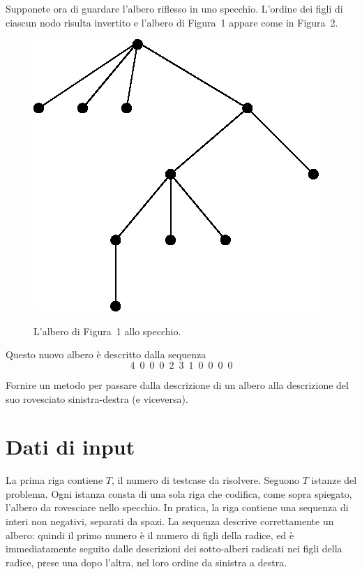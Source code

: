\documentclass[a4paper,11pt]{article}
\begin{document}
Supponete ora di guardare l'albero riflesso in uno specchio. L'ordine dei figli di ciascun nodo risulta invertito e l'albero di Figura~1 appare come in Figura~2.

\begin{figure}[h!]
  \centering
    \includegraphics[scale=0.3]{figs/fig2.png}\\
    \caption{L'albero di Figura~1 allo specchio.}
\end{figure}

Questo nuovo albero \`e descritto dalla sequenza
\[
4\,\,\,0\,\,\,0\,\,\,0\,\,\,2\,\,\,3\,\,\,1\,\,\,0\,\,\,0\,\,\,0\,\,\,0
\]

Fornire un metodo per passare dalla descrizione di un albero alla descrizione del suo rovesciato sinistra-destra (e viceversa).


\section*{Dati di input}

La prima riga contiene $T$, il numero di testcase da risolvere. Seguono $T$
istanze del problema. Ogni istanza consta di una sola riga che codifica, come sopra spiegato, l'albero da rovesciare nello specchio.
In pratica, la riga contiene una sequenza di interi non negativi, separati da spazi. La sequenza descrive correttamente un albero: quindi il primo numero è il numero di figli della radice, ed è immediatamente seguito dalle descrizioni dei sotto-alberi radicati nei figli della radice, prese una dopo l'altra, nel loro ordine da sinistra a destra.
\end{document}
